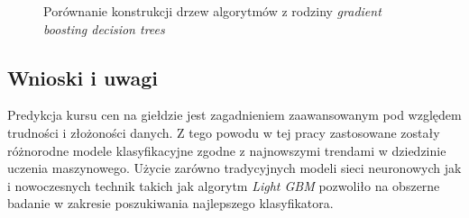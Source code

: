 \documentclass[a4paper, twoside, 11pt, openright]{article}
\begin{document}
\begin{figure}[H]%
\centering
{}%
\qquad
{}%
\caption{Porównanie konstrukcji drzew algorytmów z rodziny \textit{gradient boosting decision trees}}
\label{level-leaf-wise}
\end{figure}







\subsection{Wnioski i uwagi}

Predykcja kursu cen na giełdzie jest zagadnieniem zaawansowanym pod względem trudności i złożoności danych. Z tego powodu w tej pracy zastosowane zostały różnorodne modele klasyfikacyjne zgodne z najnowszymi trendami w dziedzinie uczenia maszynowego. Użycie zarówno tradycyjnych modeli sieci neuronowych jak i nowoczesnych technik takich jak algorytm \textit{Light GBM} pozwoliło na obszerne badanie w zakresie poszukiwania najlepszego klasyfikatora.
\end{document}

